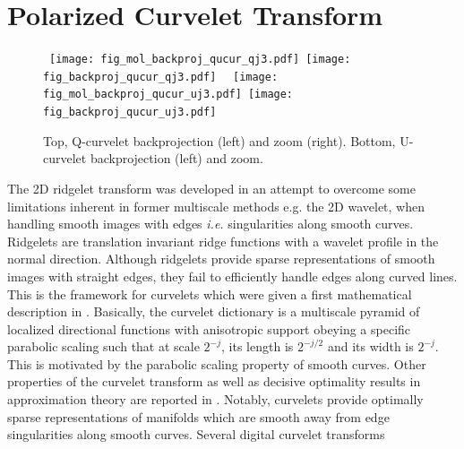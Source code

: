 \section{Polarized Curvelet Transform}
\label{sec:pol_cur}
 \begin{figure*}[htb]
\centerline{
\vbox{
 \hbox{
 \texttt{[image: fig\_mol\_backproj\_qucur\_qj3.pdf]}
 \texttt{[image: fig\_backproj\_qucur\_qj3.pdf]}
 }
 \hbox{
 \texttt{[image: fig\_mol\_backproj\_qucur\_uj3.pdf]}
 \texttt{[image: fig\_backproj\_qucur\_uj3.pdf]}
 }
 }
 }
\caption{Top, Q-curvelet backprojection (left)  and zoom (right). Bottom, U-curvelet backprojection (left)  and zoom. }
\label{fig_qucur_back}
\end{figure*}
The 2D ridgelet transform \citep{cur:candes99_1} was developed in an attempt to overcome some limitations inherent in former multiscale methods 
e.g. the 2D wavelet, when handling smooth images with edges \textit{i.e.} singularities along smooth curves. Ridgelets are translation 
invariant ridge functions with a wavelet profile in the normal direction. Although ridgelets provide sparse representations of smooth 
images with straight edges, they fail to efficiently handle edges along curved lines. This is the framework for curvelets which were given a 
first mathematical description in \citep{Curvelets-StMalo}. Basically, the curvelet dictionary is a multiscale pyramid of localized directional 
functions with anisotropic support obeying a specific parabolic scaling such that at scale $2^{-j}$, its length is $2^{-j/2}$ and its width is $2^{-j}$. 
This is motivated by the parabolic scaling property of smooth curves. Other properties of the curvelet transform as well as decisive optimality results 
in approximation theory are reported in \citep{Curvelets-StMalo}. Notably, curvelets provide optimally sparse representations 
of manifolds which are smooth away from edge singularities along smooth curves. Several digital curvelet transforms \citep{cur:donoho99,starck:sta01_3,cur:demanet06} 
